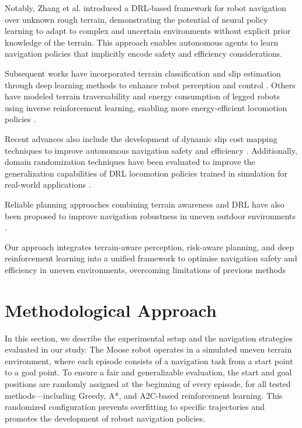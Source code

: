 \documentclass[conference]{IEEEtran}
\begin{document}
Notably, Zhang et al. \cite{Zhang2018DRL} introduced a DRL-based framework for robot navigation over unknown rough terrain, demonstrating the potential of neural policy learning to adapt to complex and uncertain environments without explicit prior knowledge of the terrain. This approach enables autonomous agents to learn navigation policies that implicitly encode safety and efficiency considerations.

Subsequent works have incorporated terrain classification and slip estimation through deep learning methods to enhance robot perception and control \cite{gonzalez2018deepterramechanics}. Others have modeled terrain traversability and energy consumption of legged robots using inverse reinforcement learning, enabling more energy-efficient locomotion policies \cite{gan2022energy}.

Recent advances also include the development of dynamic slip cost mapping techniques to improve autonomous navigation safety and efficiency \cite{slipnet2024}. Additionally, domain randomization techniques have been evaluated to improve the generalization capabilities of DRL locomotion policies trained in simulation for real-world applications \cite{mdpi2022randomization}.

Reliable planning approaches combining terrain awareness and DRL have also been proposed to improve navigation robustness in uneven outdoor environments \cite{weerakoon2022terp}.

Our approach integrates terrain-aware perception, risk-aware planning, and deep reinforcement learning into a unified framework to optimise navigation safety and efficiency in uneven environments, overcoming limitations of previous methods

\section{Methodological Approach}

In this section, we describe the experimental setup and the navigation strategies evaluated in our study. The Moose robot operates in a simulated uneven terrain environment, where each episode consists of a navigation task from a start point to a goal point. To ensure a fair and generalizable evaluation, the start and goal positions are randomly assigned at the beginning of every episode, for all tested methods—including Greedy, A*, and A2C-based reinforcement learning. This randomized configuration prevents overfitting to specific trajectories and promotes the development of robust navigation policies.
\end{document}
